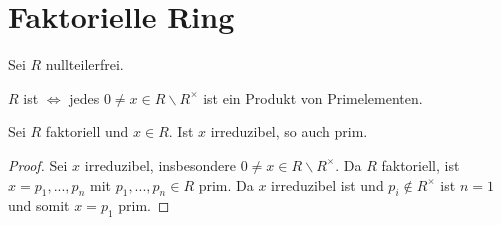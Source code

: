 \section{Faktorielle Ring}

Sei $R$ nullteilerfrei.

\begin{definition}
	$R$ ist  $\iff$ jedes $0\neq x\in R\backslash R^\times$ ist ein Produkt von Primelementen.
\end{definition}

\begin{lemma}
	Sei $R$ faktoriell und $x\in R$. Ist $x$ irreduzibel, so auch prim.
\end{lemma}
\begin{proof}
	Sei $x$ irreduzibel, insbesondere $0\neq x\in R\backslash R^\times$. Da $R$ faktoriell, ist $x=p_1,...,p_n$ mit $p_1,...,p_n\in R$ prim. Da $x$ irreduzibel ist und $p_i\notin R^\times$ ist $n=1$ und somit $x=p_1$ prim.
\end{proof}
